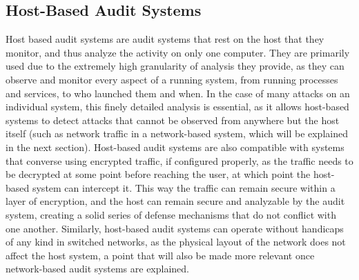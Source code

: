 \documentclass{acm_proc_article-sp}
\begin{document}
    \subsection{Host-Based Audit Systems}
    Host based audit systems are audit systems that rest on the host that they monitor, and thus analyze the activity on only one computer. They are primarily used due to the extremely high granularity of analysis they provide, as they can observe and monitor every aspect of a running system, from running processes and services, to who launched them and when. In the case of many attacks on an individual system, this finely detailed analysis is essential, as it allows host-based systems to detect attacks that cannot be observed from anywhere but the host itself (such as network traffic in a network-based system, which will be explained in the next section). Host-based audit systems are also compatible with systems that converse using encrypted traffic, if configured properly, as the traffic needs to be decrypted at some point before reaching the user, at which point the host-based system can intercept it. This way the traffic can remain secure within a layer of encryption, and the host can remain secure and analyzable by the audit system, creating a solid series of defense mechanisms that do not conflict with one another. Similarly, host-based audit systems can operate without handicaps of any kind in switched networks, as the physical layout of the network does not affect the host system, a point that will also be made more relevant once network-based audit systems are explained. 
    
\end{document}
